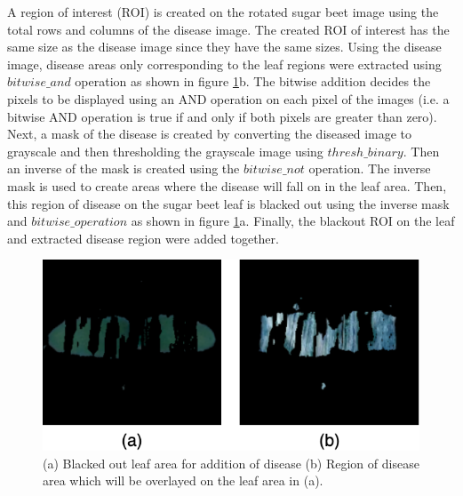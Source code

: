 A region of interest (ROI) is created on the rotated sugar beet image using the total rows and columns of the disease image. The created ROI of interest has the same size as the disease image since they have the same sizes. Using the disease image, disease areas only corresponding to the leaf regions were extracted using $bitwise\_and$ operation as shown in figure \ref{fig:my_blackout}b. The bitwise addition decides the pixels to be displayed using an AND operation on each pixel of the images (i.e. a bitwise AND operation is true if and only if both pixels are greater than zero). Next, a mask of the disease is created by converting the diseased image to grayscale and then thresholding the grayscale image using $thresh\_binary$. Then an inverse of the mask is created using the $bitwise\_not$ operation. The inverse mask is used to create areas where the disease will fall on in the leaf area. Then, this region of disease on the sugar beet leaf is blacked out using the inverse mask and $bitwise\_operation$ as shown in figure \ref{fig:my_blackout}a.
Finally, the blackout ROI on the leaf and extracted disease region were added together.



\begin{figure}[!htb]
    \centering
    \includegraphics[scale=0.55, keepaspectratio]{Figures/notebook/blackedout.png}
    \caption{(a) Blacked out leaf area for addition of disease (b) Region of disease area which will be overlayed on the leaf area in (a).}
    \label{fig:my_blackout}
\end{figure} 

